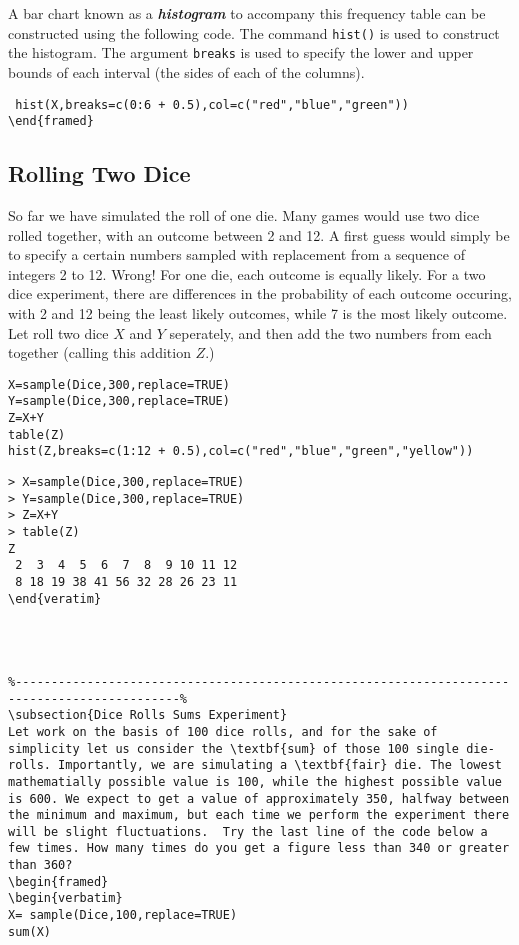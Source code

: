 \documentclass[11pt]{article} %
\begin{document}
A bar chart known as a \textbf{\textit{histogram}} to accompany this frequency table can be constructed using the following code. The command \texttt{hist()} is used to construct the histogram. The argument \texttt{breaks} is used to specify the lower and upper bounds of each interval (the sides of each of the columns).
\begin{framed}
\begin{verbatim}
 hist(X,breaks=c(0:6 + 0.5),col=c("red","blue","green"))
\end{framed}
\end{verbatim}

\subsection{Rolling Two Dice}
So far we have simulated the roll of one die. Many games would use two dice rolled together, with an outcome between 2 and 12. A first guess would simply be to specify a certain numbers sampled with replacement from a sequence of integers 2 to 12. Wrong! 
For one die, each outcome is equally likely. For a two dice experiment, there are differences in the probability of each outcome occuring, with 2 and 12  being the least likely outcomes, while 7 is the most likely outcome.
Let roll two dice $X$ and $Y$ seperately, and then add the two numbers from each together (calling this addition $Z$.)


\begin{framed}
\begin{verbatim}
X=sample(Dice,300,replace=TRUE)
Y=sample(Dice,300,replace=TRUE)
Z=X+Y
table(Z)
hist(Z,breaks=c(1:12 + 0.5),col=c("red","blue","green","yellow"))
\end{verbatim}
\end{framed}
\begin{verbatim}
> X=sample(Dice,300,replace=TRUE)
> Y=sample(Dice,300,replace=TRUE)
> Z=X+Y
> table(Z)
Z
 2  3  4  5  6  7  8  9 10 11 12 
 8 18 19 38 41 56 32 28 26 23 11
\end{veratim}




%---------------------------------------------------------------------------------------------%
\subsection{Dice Rolls Sums Experiment}
Let work on the basis of 100 dice rolls, and for the sake of simplicity let us consider the \textbf{sum} of those 100 single die-rolls. Importantly, we are simulating a \textbf{fair} die. The lowest mathematially possible value is 100, while the highest possible value is 600. We expect to get a value of approximately 350, halfway between the minimum and maximum, but each time we perform the experiment there will be slight fluctuations.  Try the last line of the code below a few times. How many times do you get a figure less than 340 or greater than 360?
\begin{framed}
\begin{verbatim}
X= sample(Dice,100,replace=TRUE)
sum(X)


\end{verbatim}
\end{framed}
\end{document}
